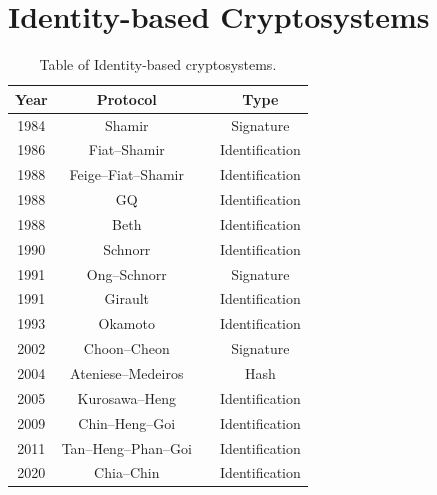 % 




\section{Identity-based Cryptosystems}
\label{sec::chp2::identity-based-ciphers}

\begin{table}[]
    \small
    \centering
    \caption{Table of Identity-based cryptosystems.}
    \label{tab:my_label}
\begin{tabular}{cccc}
\toprule
\textbf{Year} & \textbf{Protocol} & & \textbf{Type} \\
\midrule
1984 & Shamir & \cite{shamir_identity-based_1984} & Signature \\
1986 & Fiat--Shamir & \cite{fiat_how_1986} & Identification \\
1988 & Feige--Fiat--Shamir & \cite{feige_zero-knowledge_1988} & Identification \\
1988 & GQ & \cite{guillou_practical_1988} & Identification \\
1988 & Beth & \cite{beth_efficient_1988} & Identification \\
1990 & Schnorr & \cite{schnorr_efficient_1990} & Identification \\
1991 & Ong--Schnorr & \cite{ong_fast_1991} & Signature \\
1991 & Girault & \cite{girault_identity-based_1991} & Identification \\
1993 & Okamoto & \cite{okamoto_provably_1993} & Identification \\
2002 & Choon--Cheon & \cite{choon_identity-based_2002} & Signature \\
2004 & Ateniese--Medeiros & \cite{ateniese_identity-based_2004} & Hash \\
2005 & Kurosawa--Heng & \cite{kurosawa_identity-based_2005} & Identification \\
2009 & Chin--Heng--Goi & \cite{chin_hierarchical_2009} & Identification \\
2011 & Tan--Heng--Phan--Goi & \cite{tan_variant_2011} & Identification \\
2020 & Chia--Chin & \cite{chia_identity_2020} & Identification \\
\bottomrule
\end{tabular} 
\end{table}

